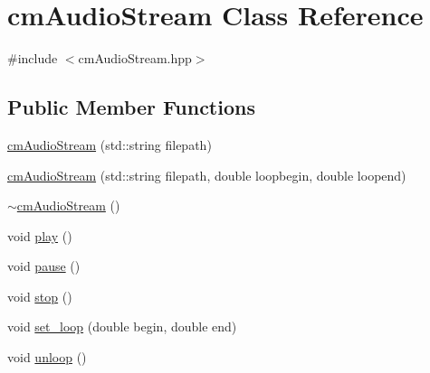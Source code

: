 \hypertarget{classcm_audio_stream}{\section{cm\-Audio\-Stream Class Reference}
\label{classcm_audio_stream}
}


{\ttfamily \#include $<$cm\-Audio\-Stream.\-hpp$>$}

\subsection*{Public Member Functions}
\begin{DoxyCompactItemize}
\item 
\hyperlink{classcm_audio_stream_ac54ae3acd02309749da8efdbe7eaca6b}{cm\-Audio\-Stream} (std\-::string filepath)
\item 
\hyperlink{classcm_audio_stream_aa24d462b8e5ef82e581edfbecbc56d22}{cm\-Audio\-Stream} (std\-::string filepath, double loopbegin, double loopend)
\item 
\hyperlink{classcm_audio_stream_a0a5e40b049793fc3e77bed078d6ac2e5}{$\sim$cm\-Audio\-Stream} ()
\item 
void \hyperlink{classcm_audio_stream_a313268197ed3025b1c67fef41f26beab}{play} ()
\item 
void \hyperlink{classcm_audio_stream_ab8f35342f8c4d828f0ec30f11f9bd741}{pause} ()
\item 
void \hyperlink{classcm_audio_stream_a83acc5f1c315b384b6a26a63f5b0d469}{stop} ()
\item 
void \hyperlink{classcm_audio_stream_aade2910b12661f28af69f4188fbf8ea7}{set\-\_\-loop} (double begin, double end)
\item 
void \hyperlink{classcm_audio_stream_a9838a0c9207ff77d1f3f337c32cd90da}{unloop} ()
\end{DoxyCompactItemize}


